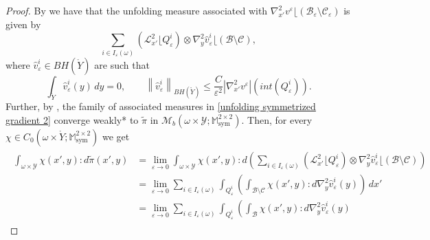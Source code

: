 \documentclass[reqno,10pt]{amsart}
\numberwithin{equation}{section}
\theoremstyle{remark}
\newcommand{\calB}{\mathcal{B}}
\newcommand{\calC}{\mathcal{C}}
\newcommand{\calH}{\mathcal{H}}
\newcommand{\calL}{\mathcal{L}}
\newcommand{\M}{\mathbb{M}}
\newcommand{\calY}{\mathcal{Y}}
\DeclareMathOperator{\sym}{sym}
\newcommand{\weakstar}{\xrightharpoonup{*}}
\renewcommand{\div}{\operatorname{div}}
\newcommand{\eps}{\varepsilon}
\newcommand{\Mb}{\mathcal{M}_b}
\newcommand{\mres}[1]{\lfloor{#1}}
\newcommand{\D}{\nabla}
\begin{document}
\begin{proof}
By  we have that the unfolding measure associated with ${\D}^2_{x'}v^\eps\mres{(\calB_\eps \setminus \calC_\eps)}$ is given by
\begin{equation} \label{unfolding symmetrized gradient 2}
	\sum_{i \in I_\eps(\omega)} \left( \calL_{x'}^2\mres{Q_\eps^i} \right) \otimes {\D}^2_{y}\hat{v}_\eps^i\mres{(\calB \setminus \calC)},
\end{equation}
where $\hat{v}_\eps^i \in BH(\mathring{Y})$ are such that
\begin{equation} \label{unfolding inequality 2}
	\int_{\mathring{Y}} \hat{v}_\eps^i(y)\,dy=0, \qquad \left\|\hat{v}_\eps^i\right\|_{BH(\mathring{Y})}
	\leq \frac{C}{\eps^2} |{\D}^2_{x'}v^\eps|\left(int(Q_\eps^i)\right).
\end{equation}
Further, by , the family of associated measures in \eqref{unfolding symmetrized gradient 2} converge weakly* to $\tilde{\pi}$ in $\Mb(\omega \times \calY;\M^{2 \times 2}_{\sym})$. 
Then, for every $\chi \in C_0(\omega \times \mathring{Y};\M^{2 \times 2}_{\sym})$ 
we get
\begin{align*} %
\begin{split}
	\int_{\omega \times \calY} \chi(x', y) : d\tilde{\pi}(x', y)
	& = \lim_{\eps \to 0} \int_{\omega \times \calY} \chi(x', y) : d\left(\sum_{i \in I_\eps(\omega)} \left( \calL_{x'}^2\mres{Q_\eps^i} \right) \otimes {\D}^2_{y}\hat{v}_\eps^i\mres{(\calB \setminus \calC)}\right)
	\\& = \lim_{\eps \to 0} \sum_{i \in I_\eps(\omega)} \int_{Q_\eps^i} \left( \int_{\calB \setminus \calC} \chi(x', y) : d{\D}^2_{y}\hat{v}_\eps^i(y) \right) \,dx'
	\\& = \lim_{\eps \to 0} \sum_{i \in I_\eps(\omega)} \int_{Q_\eps^i} \left( \int_{\calB} \chi(x', y) : d{\D}^2_{y}\hat{v}_\eps^i(y) 

\end{split}
\end{align*}
\end{proof}
\end{document}
